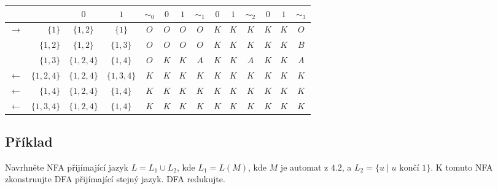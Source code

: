 \begin{center}
    \begin{tabular}{|r r|c c||c|c c||c|c c||c|c c|| c |}
        \hline
        & & $ 0 $ & $ 1 $ & $ \sim_0 $ & $ 0 $ & $ 1 $ & $ \sim_1 $ & $ 0 $ & $ 1 $ & $ \sim_2 $ & $ 0 $ & $ 1 $ & $\sim_3$ \\ \hline \hline
        $\to$ & $\{1\}$ & $\{1,2\}$ & $\{1\}$ & $O$ & $O$ & $O$ & $O$ & $K$ & $K$ & $K$ & $K$ & $K$ & $O$\\
        & $\{1,2\}$& $\{1, 2\}$ & $\{1, 3\}$ & $O$ & $O$ & $O$ & $O$ & $K$ & $K$ & $K$ & $K$ & $K$ & $B$ \\
        & $\{1,3\}$& $\{1, 2, 4\}$ & $\{1,4\}$ & $O$ & $K$ & $K$ & $A$ & $K$ & $K$ & $A$ & $K$ & $K$ & $A$ \\
        $\gets$ & $\{1,2,4\}$& $\{1, 2, 4\}$ & $\{1, 3, 4\}$ & $K$ & $K$ & $K$ & $K$ & $K$ & $K$ & $K$ & $K$ & $K$ & $K$\\
        $\gets$ & $\{1,4\}$ & $\{1,2, 4\}$ & $\{1, 4\}$ & $K$ & $K$ & $K$ & $K$ & $K$ & $K$ & $K$ & $K$ & $K$ & $K$ \\
        $\gets$ & $\{1, 3, 4\}$& $\{1, 2, 4\}$ & $\{1, 4\}$ & $K$ & $K$ & $K$ & $K$ & $K$ & $K$ & $K$ & $K$ & $K$ & $K$ \\
        \hline
    \end{tabular}

\medskip




\end{center}



\subsection{Příklad}
Navrhněte NFA přijímající jazyk $L= L_1 \cup L_2$, kde $L_1 = L(M)$, kde $M$ je automat z $4.2$, a %
${L_2 = \{u \mid u \text{ končí } 1\}}$. K tomuto NFA zkonstruujte DFA přijímající stejný jazyk. DFA redukujte.

